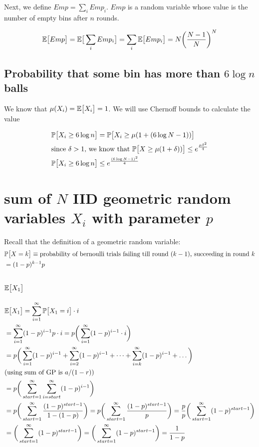 \documentclass{article}
\begin{document}
Next, we define $Emp = \sum_i Emp_i$. $Emp$ is a random variable whose
value is the number of empty bins after $n$ rounds.

$$
\mathbb{E}\big[ Emp \big] = \mathbb{E}\big[ \sum_i Emp_i \big] = \sum_i \mathbb{E}\big[ Emp_i \big] = N {\bigg (\frac{N - 1}{N} \bigg)}^N
$$


\subsection{Probability that some bin has more than $6 \log n$ balls}

We know that $\mu(X_i) = \mathbb{E}\big[ X_i \big] = 1$. We will use Chernoff bounds to calculate
the value

\begin{align*}
&\mathbb{P}\big [ X_i \geq 6 \log n \big ] = \mathbb{P}\big [ X_i \geq \mu (1 + (6 \log N - 1))  \big ] \\
&\text{since $\delta > 1$, we know that $\mathbb{P}\big [ X \geq \mu (1 + \delta)) \big ] \leq e^{\frac{\mu \delta^2}{4}}$} \\
&\mathbb{P}\big [ X_i \geq 6 \log n \big ] \leq e^\frac{(6 \log N - 1)^2}{4}
\end{align*}


\section{sum of $N$ IID geometric random variables $X_i$ with parameter $p$}
Recall that the definition of a geometric random variable:
\begin{align*}
    &\mathbb{P}\big [ X=k \big ] \equiv \text{probability of bernoulli trials failing till round $(k - 1)$, succeeding in round $k$} \\
    & = (1-p)^{k -1} p
\end{align*}

\subsection{$\mathbb{E}\big[ X_1 \big]$}
\begin{align*}
    &\mathbb{E}\big[ X_1 \big] = \sum_{i=1}^\infty \mathbb{P}\big [ X_1=i \big ] \cdot i \\
    &= \sum_{i=1}^\infty (1-p)^{i - 1} p  \cdot i
    = p \bigg(\sum_{i=1}^\infty (1-p)^{i - 1}  \cdot i \bigg) \\
    &= p \bigg(\sum_{i=1}^\infty (1-p)^{i - 1}  +
                \sum_{i=2}^\infty (1 - p)^{i-1} + \dots +
                \sum_{i=k}^\infty (1-p)^{i-1} + \dots \bigg) \\
    &\text{(using sum of GP is $a/(1-r)$)} \\
    &= p \bigg(\sum_{start=1}^\infty \sum_{i=start}^\infty (1-p)^{i - 1} \bigg) \\
    &= p \bigg(\sum_{start=1}^\infty \frac{(1-p)^{start - 1}}{1 - (1 - p)} \bigg)
    = p \bigg(\sum_{start=1}^\infty \frac{(1-p)^{start - 1}}{p} \bigg)
    = \frac{p}{p} \bigg(\sum_{start=1}^\infty (1-p)^{start - 1} \bigg) \\
    &= \bigg(\sum_{start=1}^\infty (1-p)^{start - 1} \bigg)
    = \bigg(\sum_{start=1}^\infty (1-p)^{start - 1} \bigg)
    = \frac{1}{1 - p}
\end{align*}
\end{document}
